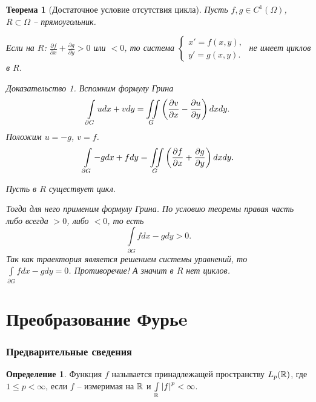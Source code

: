 \documentclass[a5paper, 10pt]{article}
\theoremstyle{definition}
\newtheorem{Def}{Определение}
\theoremstyle{plain}
\newtheorem{Th}{Теорема}
\theoremstyle{remark}
\newtheorem*{Proof}{Доказательство}
\begin{document}
	\begin{Th}[Достаточное условие отсутствия цикла]
		Пусть $f,g\in C^1(\Omega)$, $R \subset \Omega$ -- прямоугольник. 
		
		Если на $R$: $\frac{\partial f}{\partial x} + \frac{\partial g}{\partial y} > 0$ или $<0$, то система $\begin{cases}
			x' = f(x,y),\\
			y' = g(x,y).
		\end{cases}$ не имеет циклов в $R$.
	\begin{Proof}
		Вспомним формулу Грина
		\[
		\int\limits_{\partial G} udx+vdy = \iint\limits_G \left(\frac{\partial{v}}{\partial x} - \frac{\partial{u}}{\partial y}\right) dxdy.
		\]
		Положим $u=-g$, $v=f$.
		\[
		\int\limits_{\partial G} -gdx+fdy = \iint\limits_G \left(\frac{\partial{f}}{\partial x} + \frac{\partial{g}}{\partial y}\right) dxdy.
		\]
		
		Пусть в $R$ существует цикл.
		
		Тогда для него применим формулу Грина. По условию теоремы правая часть либо всегда $>0$, либо $<0$, то есть
		\[
		\int\limits_{\partial G} fdx-gdy > 0.
		\]
		Так как траектория является решением системы уравнений, то $\int\limits_{\partial G} fdx-gdy = 0$.
		Противоречие! А значит в $R$ нет циклов.
		\end{Proof}
	\end{Th}


    \part{Преобразование Фурьe}
    
    \section{Предварительные сведения}
    \begin{Def}
        Функция $f$ называется принадлежащей пространству  $L_p(\mathbb{R})$, где $1\leqslant p<\infty$, если $f$ -- измеримая на $\mathbb{R}$ и $\int\limits_{\mathbb{R}} \left|f\right|^p < \infty$.
    \end{Def}
    
\end{document}
